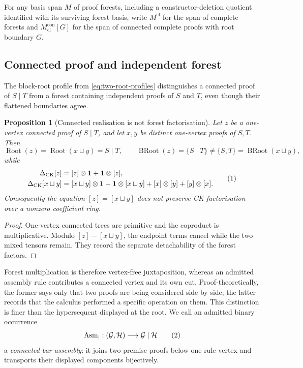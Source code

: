 \documentclass[10pt,a4paper]{article}
\theoremstyle{plain}
\newtheorem{proposition}[theorem]{Proposition}
\theoremstyle{definition}
\theoremstyle{remark}
\newcommand{\DeltaCK}{\Delta_{\mathrm{CK}}}
\newcommand{\Root}{\operatorname{Root}}
\newcommand{\BRoot}{\operatorname{BRoot}}
\newcommand{\fjoin}{\mathbin{\sqcup}}
\newcommand{\one}{\mathbf 1}
\newcommand{\eqtag}{\refstepcounter{equation}\tag{\theequation}}
\begin{document}
For any basis span \(M\) of proof forests, including a
constructor-deletion quotient identified with its surviving forest basis,
write \(M^{\mathrm{cl}}\) for the span of complete forests and
\(M_{\mathrm{cl}}^{\mathrm{con}}[G]\) for the span of connected complete
proofs with root boundary \(G\).

\subsection{Connected proof and independent forest}

The block-root profile from \eqref{eq:two-root-profiles} distinguishes a
connected proof of \(S\mid T\) from a forest containing independent proofs
of \(S\) and \(T\), even though their flattened boundaries agree.

\begin{proposition}[Connected realisation is not forest factorisation]
\label{thm:connected-factorised}
Let \(z\) be a one-vertex connected proof of \(S\mid T\), and let \(x,y\)
be distinct one-vertex proofs of \(S,T\).  Then
\[
 \Root(z)=\Root(x\fjoin y)=S\mid T,\qquad
 \BRoot(z)=\{S\mid T\}\ne\{S,T\}=\BRoot(x\fjoin y),
\]
while
\[
\begin{aligned}
 \DeltaCK[z]&=[z]\otimes\one+\one\otimes[z],\\
 \DeltaCK[x\fjoin y]&=[x\fjoin y]\otimes\one
                 +\one\otimes[x\fjoin y]
                 +[x]\otimes[y]+[y]\otimes[x] .
\end{aligned}
\eqtag\label{eq:connected-factorised}
\]
Consequently the equation \([z]=[x\fjoin y]\) does not preserve CK factorisation over
a nonzero coefficient ring.
\end{proposition}

\begin{proof}
One-vertex connected trees are primitive and the coproduct is
multiplicative.  Modulo \([z]-[x\fjoin y]\), the endpoint terms cancel while the two
mixed tensors remain.  They record the separate detachability of the forest
factors.
\end{proof}

Forest multiplication is therefore vertex-free juxtaposition, whereas an
admitted assembly rule contributes a connected vertex and its own cut.
Proof-theoretically, the former says only that two proofs are being
considered side by side; the latter records that the calculus performed a
specific operation on them.  This distinction is finer than the
hypersequent displayed at the root.  We call an admitted binary occurrence
\[
 \mathrm{Asm}_{\mid}:(\mathcal G,\mathcal H)
       \longrightarrow\mathcal G\mid\mathcal H
\eqtag\label{eq:bar-assembly-occurrence}
\]
a \emph{connected bar-assembly}: it joins two premise proofs below one
rule vertex and transports their displayed components bijectively.
\end{document}
